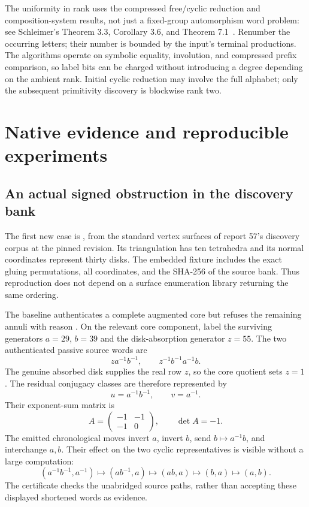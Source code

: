 \documentclass[11pt,a4paper]{article}
\theoremstyle{definition}
\theoremstyle{remark}
\newcommand{\code}[1]{\texttt{\small\detokenize{#1}}}
\begin{document}
The uniformity in rank uses the compressed free/cyclic reduction and
composition-system results, not just a fixed-group automorphism word
problem: see Schleimer's Theorem 3.3, Corollary 3.6, and
Theorem 7.1~\cite{schleimer2008}. Renumber the occurring letters; their
number is bounded by the input's terminal productions. The algorithms
operate on symbolic equality, involution, and compressed prefix comparison,
so label bits can be charged without introducing a degree depending on
the ambient rank. Initial cyclic reduction may involve the full alphabet;
only the subsequent primitivity discovery is blockwise rank two.

\section{Native evidence and reproducible experiments}
\label{sec:experiments}

\subsection{An actual signed obstruction in the discovery bank}

The first new case is , from the standard
vertex surfaces of report 57's discovery corpus at the pinned revision.
Its triangulation has ten tetrahedra and its normal coordinates represent
thirty disks. The embedded fixture includes the exact gluing permutations,
all coordinates, and the SHA-256 of the source bank. Thus reproduction does
not depend on a surface enumeration library returning the same ordering.

The baseline authenticates a complete augmented core but refuses the
remaining annuli with reason \code{annular_core_attachment}. On the relevant
core component, label the surviving generators $a=29$, $b=39$ and the
disk-absorption generator $z=55$. The two authenticated passive source words
are
\[
 z a^{-1}b^{-1},\qquad z^{-1}b^{-1}a^{-1}b.
\]
The genuine absorbed disk supplies the real row $z$, so the core quotient
sets $z=1$. The residual conjugacy classes are therefore represented by
\begin{equation}
 u=a^{-1}b^{-1},\qquad v=a^{-1}.
 \label{eq:nativepair}
\end{equation}
Their exponent-sum matrix is
\[
 A=\begin{pmatrix}-1&-1\\-1&0\end{pmatrix},\qquad \det A=-1.
\]
The emitted chronological moves invert $a$, invert $b$, send
$b\mapsto a^{-1}b$, and interchange $a,b$. Their effect on the two cyclic
representatives is visible without a large computation:
\[
 (a^{-1}b^{-1},a^{-1})
 \longmapsto (ab^{-1},a)
 \longmapsto (ab,a)
 \longmapsto (b,a)
 \longmapsto (a,b).
\]
The certificate checks the unabridged source paths, rather than accepting
these displayed shortened words as evidence.
\end{document}

